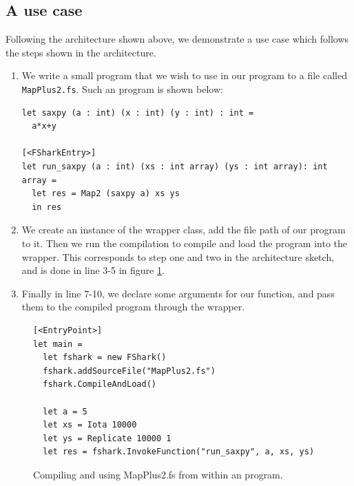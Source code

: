 \subsection{A use case}
Following the architecture shown above, we demonstrate a use case which follows
the steps shown in the architecture.
\begin{enumerate}
\item  We write a small \fshark{} program that we wish to use in our \fsharp{}
  program to a file called \texttt{MapPlus2.fs}. Such an \fshark{} program is shown below:
\begin{verbatim}
let saxpy (a : int) (x : int) (y : int) : int =
  a*x+y
  
[<FSharkEntry>]
let run_saxpy (a : int) (xs : int array) (ys : int array): int array =
  let res = Map2 (saxpy a) xs ys
  in res
\end{verbatim}

\item We create an instance of the \fshark{} wrapper class, add the file path
  of our \fshark{} program to it. Then we run the \fshark{} compilation to
  compile and load the \fshark{} program into the wrapper.
  This corresponds to step one and two in the architecture sketch, and is done
  in line 3-5 in figure \ref{fig:shortfsharkprogram1}.

\item Finally in line 7-10, we declare some arguments for our \fshark{} function, and pass
  them to the compiled \fshark{} program through the \fshark{} wrapper.
\end{enumerate}

\begin{figure}[h]
  \centering
\begin{verbatim}
[<EntryPoint>]
let main =
  let fshark = new FShark()
  fshark.addSourceFile("MapPlus2.fs")
  fshark.CompileAndLoad()

  let a = 5
  let xs = Iota 10000
  let ys = Replicate 10000 1
  let res = fshark.InvokeFunction("run_saxpy", a, xs, ys)
\end{verbatim}
  \caption{Compiling and using MapPlus2.fs from within an \fsharp{} program.}
  \label{fig:shortfsharkprogram1}
\end{figure}



